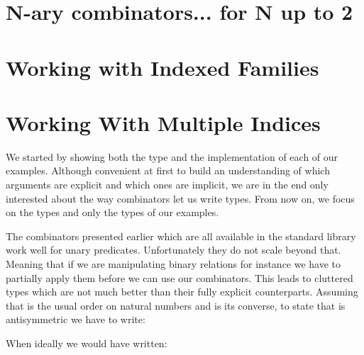
\section{N-ary combinators... for N up to 2}





\section{Working with Indexed Families}






\section{Working With Multiple Indices}

We started by showing both the type and the implementation of each of our
examples. Although convenient at first to build an understanding of which
arguments are explicit and which ones are implicit, we are in the end only
interested about the way combinators let us write types. From now on, we
focus on the types and only the types of our examples.

The combinators presented earlier which are all available in the standard
library work well for unary predicates. Unfortunately they do not scale
beyond that. Meaning that if we are manipulating binary relations for
instance we have to partially apply them before we can use our combinators.
This leads to cluttered types which are not much better than their fully
explicit counterparts. Assuming that  is the usual order on natural
numbers and  is its converse, to state that  is antisymmetric
we have to write:


When ideally we would have written:

